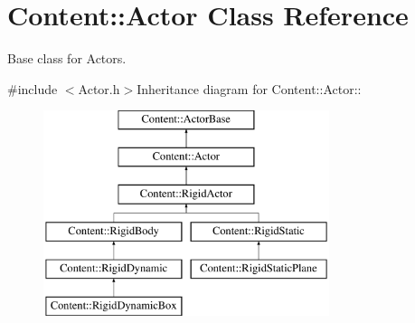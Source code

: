 \hypertarget{classContent_1_1Actor}{
\section{Content::Actor Class Reference}
\label{classContent_1_1Actor}
}


Base class for Actors.  


{\ttfamily \#include $<$Actor.h$>$}Inheritance diagram for Content::Actor::\begin{figure}[H]
\begin{center}
\leavevmode
\includegraphics[height=6cm]{classContent_1_1Actor}
\end{center}
\end{figure}
